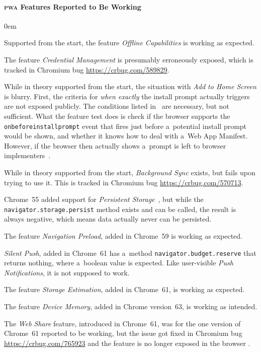 \documentclass[sigconf]{acmart}
\begin{document}
\paragraph{\textsc{pwa} Features Reported to Be Working}

\begin{description}
  \itemsep0em 
  \item[Offline Capabilities] Supported from the start, the feature \emph{Offline Capabilities}
    is working as expected.
  \item[Credential Management] The feature \emph{Credential Management}
    is presumably erroneously exposed,
     which is tracked in Chromium bug \url{https://crbug.com/589829}.    
  \item[Add to Home Screen] While in theory supported from the start,
    the situation with \emph{Add to Home Screen} is blurry.
    First, the criteria for \emph{when exactly} the install prompt actually triggers
    are not exposed publicly. The conditions listed in~\cite{kinlan2017a2hs} are necessary,
    but not sufficient.
    What the feature test does is check if the browser supports the \texttt{onbeforeinstallprompt} event
    that fires just before a~potential install prompt would be shown,
    and whether it knows how to deal
    with a~Web App Manifest.
    However, if the browser then actually shows a~prompt
    is left to browser implementers~\cite{caceres2017manifest}.
  \item[Background Sync] While in theory supported from the start,
    \emph{Background Sync} exists, but fails upon trying to use it.
    This is tracked in Chromium bug \url{https://crbug.com/570713}.
  \item[Persistent Storage] Chrome~55 added support for
     \emph{Persistent Storage}~\cite{vankesteren2018storage},
     but while the \texttt{navigator.storage.persist} method exists and can be called,
     the result is always negative, which means data actually never can be persisted.
  \item[Navigation Preload] The feature \emph{Navigation Preload}, added in Chrome~59
    is working as expected.
  \item[Silent Push] \emph{Silent Push}, added in Chrome~61 has a~method
    \texttt{navigator.budget.reserve} that returns nothing, where a~boolean value is expected.
    Like user-visible \emph{Push Notifications}, it is not supposed to work.
  \item[Storage Estimation] The feature \emph{Storage Estimation}, added in Chrome~61,
    is working as expected.
  \item[Device Memory] The feature \emph{Device Memory}, added in Chrome version~63, 
    is working as intended.
  \item[Web Share] The \emph{Web Share} feature, introduced in Chrome~61,
    was for the one version of Chrome~61 reported to be working, but the issue got fixed
    in Chromium bug \url{https://crbug.com/765923} and the feature is no longer exposed in the browser .
\end{description} 
\end{document}
